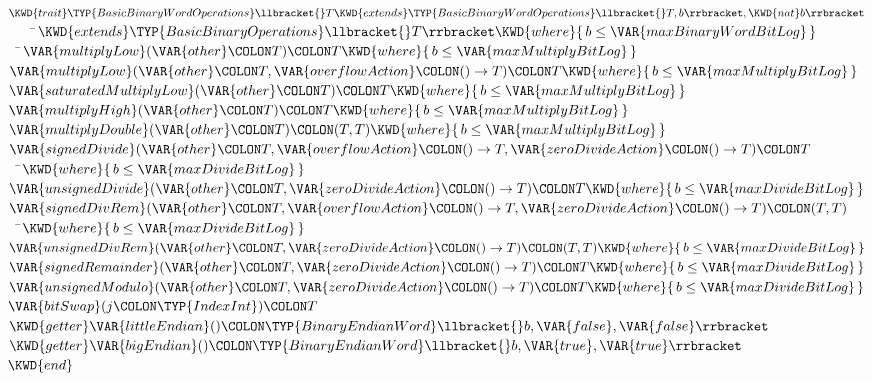 \begin{Fortress}
\(\KWD{trait} \TYP{BasicBinaryWordOperations}\llbracket{}T \KWD{extends} \TYP{BasicBinaryWordOperations}\llbracket{}T,b\rrbracket, \KWD{nat} b\rrbracket\)\\
{\tt~~~~}\pushtabs\=\+\(    \KWD{extends} \TYP{BasicBinaryOperations}\llbracket{}T\rrbracket \KWD{where} \{\,b \leq \VAR{maxBinaryWordBitLog}\,\}\)\-\\\poptabs
{\tt~~}\pushtabs\=\+\(  \VAR{multiplyLow}(\VAR{other}\COLON T)\COLON T \KWD{where} \{\,b \leq \VAR{maxMultiplyBitLog}\,\}\)\\
\(  \VAR{multiplyLow}(\VAR{other}\COLON T, \VAR{overflowAction}\COLON ()\rightarrow{}T)\COLON T \KWD{where} \{\,b \leq \VAR{maxMultiplyBitLog}\,\}\)\\
\(  \VAR{saturatedMultiplyLow}(\VAR{other}\COLON T)\COLON T \KWD{where} \{\,b \leq \VAR{maxMultiplyBitLog}\,\}\)\\
\(  \VAR{multiplyHigh}(\VAR{other}\COLON T)\COLON T \KWD{where} \{\,b \leq \VAR{maxMultiplyBitLog}\,\}\)\\
\(  \VAR{multiplyDouble}(\VAR{other}\COLON T)\COLON (T,T) \KWD{where} \{\,b \leq \VAR{maxMultiplyBitLog}\,\}\)\\
\(  \VAR{signedDivide}(\VAR{other}\COLON T, \VAR{overflowAction}\COLON ()\rightarrow{}T, \VAR{zeroDivideAction}\COLON ()\rightarrow{}T)\COLON T\)\\
{\tt~~}\pushtabs\=\+\(    \KWD{where} \{\,b \leq \VAR{maxDivideBitLog}\,\}\)\-\\\poptabs
\(  \VAR{unsignedDivide}(\VAR{other}\COLON T, \VAR{zeroDivideAction}\COLON ()\rightarrow{}T)\COLON T \KWD{where} \{\,b \leq \VAR{maxDivideBitLog}\,\}\)\\
\(  \VAR{signedDivRem}(\VAR{other}\COLON T, \VAR{overflowAction}\COLON ()\rightarrow{}T, \VAR{zeroDivideAction}\COLON ()\rightarrow{}T)\COLON (T,T)\)\\
{\tt~~}\pushtabs\=\+\(    \KWD{where} \{\,b \leq \VAR{maxDivideBitLog}\,\}\)\-\\\poptabs
\(  \VAR{unsignedDivRem}(\VAR{other}\COLON T, \VAR{zeroDivideAction}\COLON ()\rightarrow{}T)\COLON (T,T) \KWD{where} \{\,b \leq \VAR{maxDivideBitLog}\,\}\)\\
\(  \VAR{signedRemainder}(\VAR{other}\COLON T, \VAR{zeroDivideAction}\COLON ()\rightarrow{}T)\COLON T \KWD{where} \{\,b \leq \VAR{maxDivideBitLog}\,\}\)\\
\(  \VAR{unsignedModulo}(\VAR{other}\COLON T, \VAR{zeroDivideAction}\COLON ()\rightarrow{}T)\COLON T \KWD{where} \{\,b \leq \VAR{maxDivideBitLog}\,\}\)\\
\(  \VAR{bitSwap}(j\COLON \TYP{IndexInt})\COLON T\)\\
\(  \KWD{getter} \VAR{littleEndian}()\COLON \TYP{BinaryEndianWord}\llbracket{}b,\VAR{false},\VAR{false}\rrbracket\)\\
\(  \KWD{getter} \VAR{bigEndian}()\COLON \TYP{BinaryEndianWord}\llbracket{}b,\VAR{true},\VAR{true}\rrbracket\)\-\\\poptabs
\(\KWD{end}\)
\end{Fortress}


